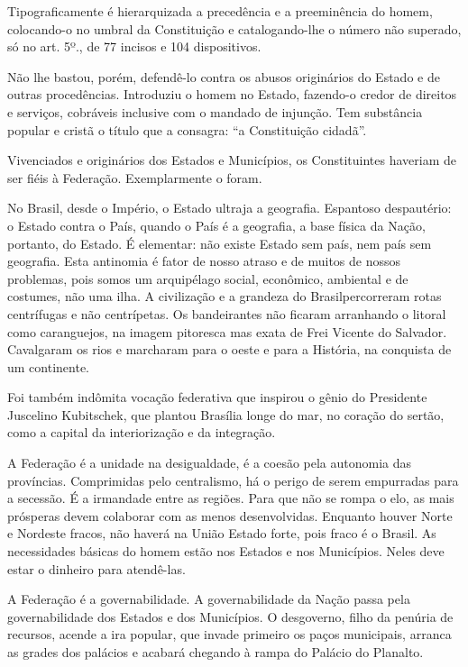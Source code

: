 Tipograficamente é hierarquizada a precedência e a preeminência do
homem, colocando-o no umbral da Constituição e catalogando-lhe o número
não superado, só no art. 5º., de 77 incisos e 104 dispositivos.

Não lhe bastou, porém, defendê-lo contra os abusos originários do Estado
e de outras procedências. Introduziu o homem no Estado, fazendo-o credor
de direitos e serviços, cobráveis inclusive com o mandado de injunção.
Tem substância popular e cristã o título que a consagra: ``a
Constituição cidadã''.

Vivenciados e originários dos Estados e Municípios, os Constituintes
haveriam de ser fiéis à Federação. Exemplarmente o foram.

No Brasil, desde o Império, o Estado ultraja a geografia. Espantoso
despautério: o Estado contra o País, quando o País é a geografia, a base
física da Nação, portanto, do Estado. É elementar: não existe Estado sem
país, nem país sem geografia. Esta antinomia é fator de nosso atraso e
de muitos de nossos problemas, pois somos um arquipélago social,
econômico, ambiental e de costumes, não uma ilha. A civilização e a
grandeza do Brasilpercorreram rotas centrífugas e não centrípetas. Os
bandeirantes não ficaram arranhando o litoral como caranguejos, na
imagem pitoresca mas exata de Frei Vicente do Salvador. Cavalgaram os
rios e marcharam para o oeste e para a História, na conquista de um
continente.

Foi também indômita vocação federativa que inspirou o gênio do
Presidente Juscelino Kubitschek, que plantou Brasília longe do mar, no
coração do sertão, como a capital da interiorização e da integração.

A Federação é a unidade na desigualdade, é a coesão pela autonomia das
províncias. Comprimidas pelo centralismo, há o perigo de serem
empurradas para a secessão. É a irmandade entre as regiões. Para que não
se rompa o elo, as mais prósperas devem colaborar com as menos
desenvolvidas. Enquanto houver Norte e Nordeste fracos, não haverá na
União Estado forte, pois fraco é o Brasil. As necessidades básicas do
homem estão nos Estados e nos Municípios. Neles deve estar o dinheiro
para atendê-las.

A Federação é a governabilidade. A governabilidade da Nação passa pela
governabilidade dos Estados e dos Municípios. O desgoverno, filho da
penúria de recursos, acende a ira popular, que invade primeiro os paços
municipais, arranca as grades dos palácios e acabará chegando à rampa do
Palácio do Planalto.

